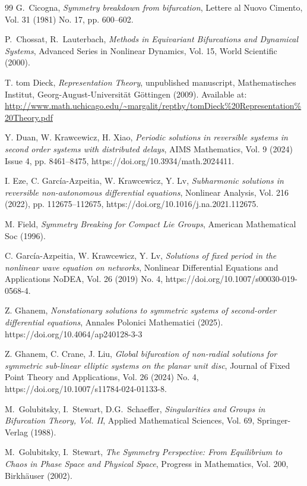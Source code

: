 \documentclass[twoside]{article}%
\begin{document}
\begin{thebibliography}{99}
 G.~Cicogna, \emph{Symmetry breakdown from bifurcation}, Lettere al Nuovo Cimento, Vol. 31 (1981) No. 17, pp. 600--602.

 P.~Chossat, R.~Lauterbach, \emph{Methods in Equivariant Bifurcations and Dynamical Systems}, Advanced Series in Nonlinear Dynamics, Vol. 15, World Scientific (2000).

 T. tom Dieck, \emph{Representation Theory}, unpublished manuscript, Mathematisches Institut, Georg-August-Universität Göttingen (2009). Available at: \url{http://www.math.uchicago.edu/~margalit/repthy/tomDieck%20Representation%20Theory.pdf}

 Y. Duan,  W. Krawcewicz, H. Xiao, {\it Periodic solutions in reversible systems in second order systems with distributed delays}, AIMS Mathematics, Vol. 9 (2024) Issue 4, pp. 8461–8475, https://doi.org/10.3934/math.2024411.


 I. Eze, C. García-Azpeitia,  W. Krawcewicz,  Y. Lv,  {\it Subharmonic solutions in reversible non-autonomous differential equations}, Nonlinear Analysis, Vol. 216 (2022), pp. 112675–112675, https://doi.org/10.1016/j.na.2021.112675.

 M. Field, \emph{Symmetry Breaking for Compact Lie Groups}, American Mathematical Soc (1996).


 C. García-Azpeitia,  W. Krawcewicz, Y. Lv,  {\it Solutions of fixed period in the nonlinear wave equation on networks}, Nonlinear Differential Equations and Applications NoDEA, Vol. 26 (2019) No. 4, https://doi.org/10.1007/s00030-019-0568-4.

 Z. Ghanem, \emph{Nonstationary solutions to symmetric systems of second-order differential equations}, Annales Polonici Mathematici (2025). https://doi.org/10.4064/ap240128-3-3

 Z. Ghanem,  C. Crane,  J. Liu,  {\it Global bifurcation of non-radial solutions for symmetric sub-linear elliptic systems on the planar unit disc}, Journal of Fixed Point Theory and Applications, Vol. 26 (2024) No. 4, https://doi.org/10.1007/s11784-024-01133-8.

 M.~Golubitsky, I.~Stewart, D.G.~Schaeffer, \emph{Singularities and Groups in Bifurcation Theory, Vol. II}, Applied Mathematical Sciences, Vol. 69, Springer-Verlag (1988).

 M.~Golubitsky, I.~Stewart, \emph{The Symmetry Perspective: From Equilibrium to Chaos in Phase Space and Physical Space}, Progress in Mathematics, Vol. 200, Birkh\"auser (2002).


\end{thebibliography}
\end{document}
